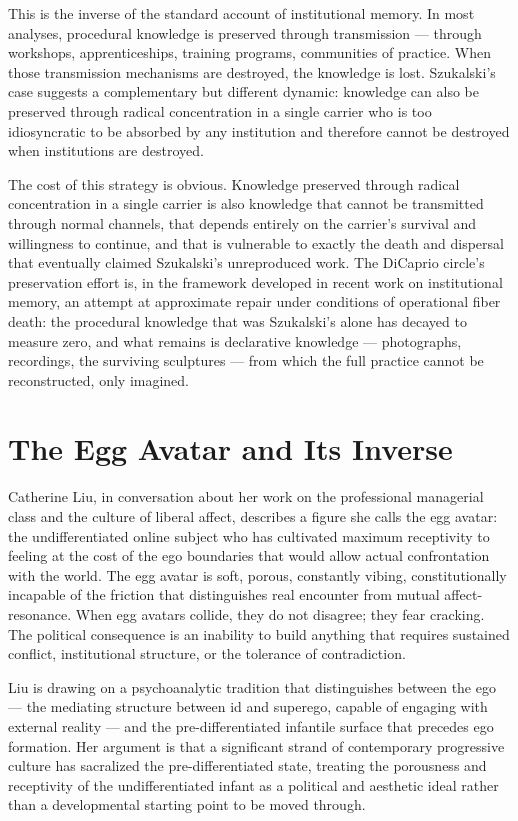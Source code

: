 \documentclass[11pt, a4paper]{article}
\theoremstyle{named}
\begin{document}
This is the inverse of the standard account of institutional memory.
In most analyses, procedural knowledge is preserved through
transmission — through workshops, apprenticeships, training
programs, communities of practice. When those transmission mechanisms
are destroyed, the knowledge is lost. Szukalski's case suggests a
complementary but different dynamic: knowledge can also be preserved
through radical concentration in a single carrier who is too
idiosyncratic to be absorbed by any institution and therefore cannot
be destroyed when institutions are destroyed.

The cost of this strategy is obvious. Knowledge preserved through
radical concentration in a single carrier is also knowledge that
cannot be transmitted through normal channels, that depends entirely
on the carrier's survival and willingness to continue, and that is
vulnerable to exactly the death and dispersal that eventually claimed
Szukalski's unreproduced work. The DiCaprio circle's preservation
effort is, in the framework developed in recent work on institutional
memory, an attempt at approximate repair under conditions of
operational fiber death: the procedural knowledge that was Szukalski's
alone has decayed to measure zero, and what remains is declarative
knowledge — photographs, recordings, the surviving sculptures — from
which the full practice cannot be reconstructed, only imagined.

\section{The Egg Avatar and Its Inverse}

Catherine Liu, in conversation about her work on the professional
managerial class and the culture of liberal affect, describes a figure
she calls the egg avatar: the undifferentiated online subject who has
cultivated maximum receptivity to feeling at the cost of the ego
boundaries that would allow actual confrontation with the world. The
egg avatar is soft, porous, constantly vibing, constitutionally
incapable of the friction that distinguishes real encounter from
mutual affect-resonance. When egg avatars collide, they do not
disagree; they fear cracking. The political consequence is an inability
to build anything that requires sustained conflict, institutional
structure, or the tolerance of contradiction.

Liu is drawing on a psychoanalytic tradition that distinguishes between
the ego — the mediating structure between id and superego, capable of
engaging with external reality — and the pre-differentiated infantile
surface that precedes ego formation. Her argument is that a significant
strand of contemporary progressive culture has sacralized the
pre-differentiated state, treating the porousness and receptivity of
the undifferentiated infant as a political and aesthetic ideal rather
than a developmental starting point to be moved through.
\end{document}
